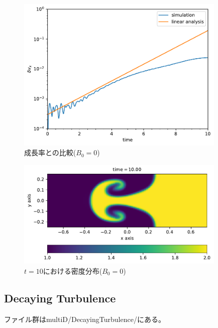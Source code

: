 \begin{figure}[htpb]
    \centering
    \includegraphics[width=10cm]{figs_mhd/vx_evo.pdf}
    \caption{成長率との比較($B_0=0$)}
    \label{fig:my_label}
\end{figure}

\begin{figure}[htpb]
    \centering
    \includegraphics[width=10cm]{figs_mhd/snap00010.pdf}
    \caption{$t=10$における密度分布($B_0=0$)}
    \label{fig:my_label}
\end{figure}



\clearpage
\subsection{Decaying Turbulence}

ファイル群は{\ttfamily multiD/DecayingTurbulence/}にある。


